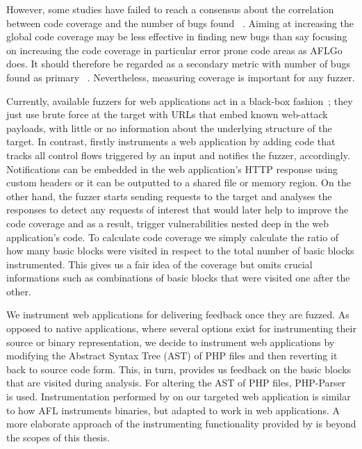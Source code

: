 However, some studies have failed to reach a consensus about the correlation between code coverage and the number of bugs found ~\cite{klees2018Evaluation,coverage2014effectiveness}. 
Aiming at increasing the global code coverage may be less effective in finding new bugs than say focusing on increasing the code coverage in particular error prone code areas as AFLGo ~\cite{bohme2017directed} does. It should therefore be regarded as a secondary metric with number of bugs found as primary ~\cite{klees2018Evaluation}. Nevertheless, measuring coverage is important for any fuzzer.

Currently, available fuzzers for web applications act in a black-box fashion~\cite{doupe2010johnny}; they just use brute force at the target with URLs that embed known web-attack payloads, with little or no information about the underlying structure of the target. 
In contrast, \pname firstly instruments a web application by adding code that tracks all control flows triggered by an input and notifies the fuzzer, accordingly. Notifications can be embedded in the web application's HTTP response using custom headers or it can be outputted to a shared file or memory region. On the other hand, the fuzzer starts sending requests to the target and analyses the responses to detect any requests of interest that would later help to improve the code coverage and as a result, trigger vulnerabilities nested deep in the web application's code. To calculate code coverage we simply calculate the ratio of how many basic blocks were visited in respect to the total number of basic blocks instrumented. This gives us a fair idea of the coverage but omits crucial informations such as combinations of basic blocks that were visited one after the other.

We instrument web applications for delivering feedback once
they are fuzzed. As opposed to native applications, where
several options exist for instrumenting their source or binary
representation, we decide to instrument web applications by
modifying the Abstract Syntax Tree (AST) of PHP files and then reverting it back to source code form. This, in turn, provides us feedback on the basic blocks that are visited during analysis. For altering the AST of PHP files, PHP-Parser ~\cite{nikicPhpParser} is used. 
Instrumentation performed by \pname on our targeted web application is similar to how AFL instruments binaries, but adapted to work in web applications. A more elaborate approach of the instrumenting functionality provided by \pname is beyond the scopes of this thesis.

